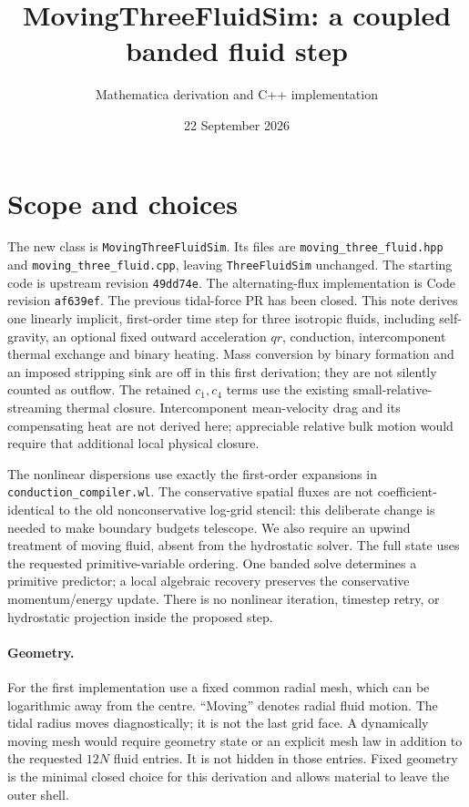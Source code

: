 \documentclass[11pt]{article}
\title{MovingThreeFluidSim: a coupled banded fluid step}
\author{Mathematica derivation and C++ implementation}
\date{22 September 2026}
\begin{document}
\maketitle

\section{Scope and choices}
The new class is \texttt{MovingThreeFluidSim}. Its files are
\texttt{moving\_\allowbreak three\_\allowbreak fluid.hpp} and
\texttt{moving\_\allowbreak three\_\allowbreak fluid.cpp}, leaving \texttt{ThreeFluidSim}
unchanged. The starting code is upstream revision \texttt{49dd74e}.
The alternating-flux implementation is Code revision \texttt{af639ef}.
The previous tidal-force PR has been closed. This note derives one
linearly implicit, first-order time step for three isotropic fluids,
including self-gravity, an optional fixed outward acceleration $qr$,
conduction, intercomponent thermal exchange and binary heating.
Mass conversion by binary formation and an imposed stripping sink are
off in this first derivation; they are not silently counted as outflow.
The retained $c_1,c_4$ terms use the existing small-relative-streaming
thermal closure. Intercomponent mean-velocity drag and its compensating
heat are not derived here; appreciable relative bulk motion would require
that additional local physical closure.

The nonlinear dispersions use exactly the first-order expansions in
\texttt{conduction\_compiler.wl}. The conservative spatial fluxes are
not coefficient-identical to the old nonconservative log-grid stencil:
this deliberate change is needed to make boundary budgets telescope.
We also require an upwind treatment of moving fluid, absent from the
hydrostatic solver. The full state uses the requested primitive-variable
ordering. One banded solve determines a primitive predictor; a local
algebraic recovery preserves the conservative momentum/energy update.
There is no nonlinear iteration, timestep retry, or hydrostatic projection
inside the proposed step.

\paragraph{Geometry.}
For the first implementation use a fixed common radial mesh, which can
be logarithmic away from the centre. ``Moving'' denotes radial fluid
motion. The tidal radius moves diagnostically; it is not the last grid
face. A dynamically moving mesh would require geometry state or an
explicit mesh law in addition to the requested $12N$ fluid entries.
It is not hidden in those entries. Fixed geometry is the minimal closed
choice for this derivation and allows material to leave the outer shell.
\end{document}
